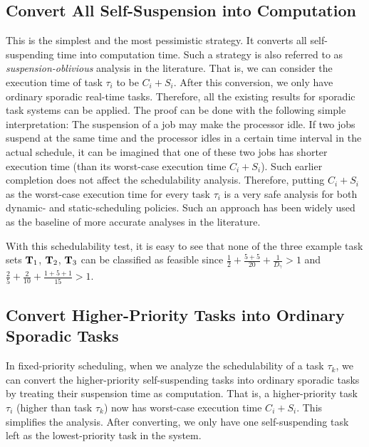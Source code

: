 \begin{table}[t]
\begin{table}[t]
\subsection{Convert All Self-Suspension into Computation}
\label{sec:oblivious}

 This is the simplest and the most pessimistic strategy. It converts all self-suspending time into computation time. Such a strategy is also referred to as \emph{suspension-oblivious} analysis in the literature. That is, we can consider the execution time of task $\tau_i$ to be $C_i+S_i$. After this conversion, we only have ordinary sporadic real-time tasks. Therefore, all the existing results for sporadic task systems can be applied. The proof can be done with the following simple interpretation: The suspension of a job may make the processor idle. If two jobs suspend at the same time and the processor idles in a certain time interval in the actual schedule, it can be imagined that one of these two jobs has shorter execution time (than its worst-case execution time $C_i+S_i$). Such earlier completion does not affect the schedulability analysis. Therefore, putting $C_i+S_i$ as the worst-case execution time for every task $\tau_i$ is a very safe analysis for both dynamic- and static-scheduling policies.  Such an approach has been widely used as the baseline of more accurate analyses in the literature.

With this schedulability test, it is easy to see that none of the three example task sets ${\bf T}_1$, ${\bf T}_2$, ${\bf T}_3$ can be classified as feasible since $\frac{1}{2} + \frac{5+5}{20} + \frac{1}{D_\gamma} > 1$ and $\frac{2}{5}+\frac{2}{10}+\frac{1+5+1}{15} > 1$.

\subsection{Convert Higher-Priority Tasks into Ordinary Sporadic Tasks}
\label{sec:high-as-sporadic} 

In fixed-priority scheduling, when we analyze the schedulability of a task $\tau_k$, we can convert the higher-priority self-suspending tasks into ordinary sporadic tasks by treating their suspension time as computation. That is, a higher-priority task $\tau_i$ (higher than task $\tau_k$) now has worst-case execution time $C_i+S_i$. This simplifies the analysis. After converting, we only have one self-suspending task left as the lowest-priority task in the system.  


\end{table}
\end{table}

